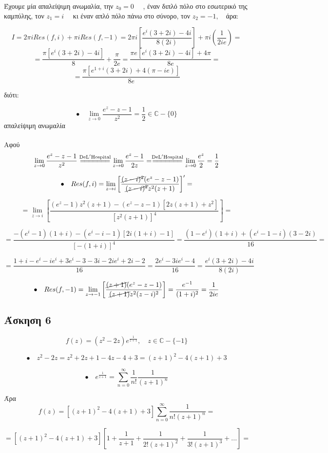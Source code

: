 \documentclass[12pt]{article}
\begin{document}
Έχουμε μία απαλείψιμη ανωμαλία, την $z_0=0 \quad$ , έναν διπλό πόλο στο εσωτερικό της καμπύλης, τον $z_1=i \quad$ κι έναν απλό πόλο πάνω στο σύνορο, τον $z_2=-1, \quad$άρα:

$$I=2\pi i Res(f,i) + \pi i Res(f,-1)= 2\pi i \left[ \frac{e^i(3+2i)-4i}{8(2i)} \right]+ \pi i \left( \frac{1}{2ie} \right)= $$
$$= \frac{\pi [e^i(3+2i)-4i]}{8}+\frac{\pi}{2e}= \frac{\pi e [e^i(3+2i)-4i] +4\pi}{8e}= $$
$$=\frac{\pi[e^{1+i}(3+2i)+4(\pi-ie)]}{8e} $$


διότι:

$$ \bullet \quad \lim_{z\to 0} \frac{e^z-z-1}{z^2}= \frac{1}{2} \in \mathbb{C}-\{0\}$$
απαλείψιμη ανωμαλία \\ \\
Αφού 
$$\lim_{z \to 0}\frac{e^z-z-1}{z^2} 
\overset{\mathrm{De L'Hospital}}{=\joinrel=\joinrel=\joinrel=\joinrel=\joinrel=\joinrel=}
\lim_{z \to 0}\frac{e^z-1}{2z} 
=\overset{\mathrm{De L'Hospital}}{=\joinrel=\joinrel=\joinrel=\joinrel=\joinrel=\joinrel=}
\lim_{z \to 0}\frac{e^z}{2}=\frac{1}{2}
$$

$$ \bullet \quad Res(f,i)=\lim_{z \to i}
\left[\frac{\cancel{(z-i)^2}( e^z -z -1)}{\cancel{(z-i)^2}z^2(z+1)}\right]'=
$$ 

$$=\lim_{z \to i}
\left[\frac{( e^z -1)z^2(z+1)-(e^z-z-1)[2z(z+1)+z^2]}{[z^2(z+1)]^4}\right]= 
$$

$$=\frac{-( e^i -1)(1+i)-(e^i-i-1)[2i(1+i)-1]}{[-(1+i)]^4}=\frac{(1-e^i)(1+i)+(e^i-1-i)(3-2i)}{16}= 
$$

$$=\frac{1+i-e^i-ie^i+3e^i-3-3i-2ie^i+2i-2}{16}=\frac{2e^i-3ie^i-4}{16}=\frac{e^i(3+2i)-4i}{8(2i)}$$


$$ \bullet \quad Res(f,-1)=\lim_{z \to -1}
\left[\frac{\cancel{(z+1)}( e^z -z -1)}{\cancel{(z+1)}z^2(z-i)^2}\right]=\frac{e^{-1}}{(1+i)^2}=\frac{1}{2ie}
$$ 


\newpage
 \subsection{Άσκηση 6}

$$ f(z)= (z^2-2z)e^{\frac{1}{z+1}} , \quad z\in \mathbb{C}-\{-1\} $$

$$ \bullet \quad z^2-2z=z^2+2z+1-4z-4+3=(z+1)^2-4(z+1)+3 $$

$$ \bullet \quad e^{\frac{1}{z+1}}=\sum_{n=0}^{\infty} \frac{1}{n!}\frac{1}{(z+1)^n} $$

Άρα 
$$f(z)= [(z+1)^2-4(z+1)+3]\sum_{n=0}^{\infty} \frac{1}{n!(z+1)^n}= $$

$$=[(z+1)^2-4(z+1)+3]\left[1+\frac{1}{z+1}+\frac{1}{2!(z+1)^2}+\frac{1}{3!(z+1)^3}+...\right]=$$
\end{document}
